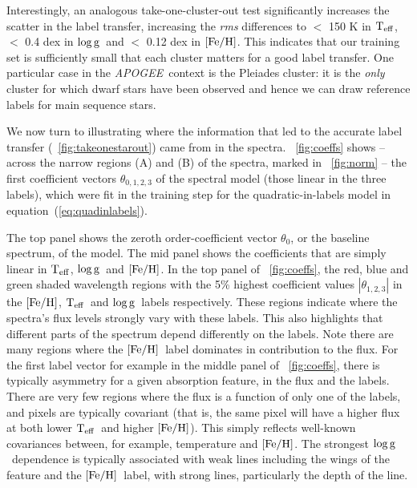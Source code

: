 \documentclass[12pt, preprint]{aastex}
\newcommand{\apogee}{\textsl{APOGEE}}
\newcommand{\teff}{\mbox{$\rm T_{eff}$}}
\newcommand{\feh}{\mbox{$\rm [Fe/H]$}}
\newcommand{\logg}{\mbox{$\rm \log g$}}
\begin{document}
Interestingly, an analogous take-one-cluster-out test significantly increases the scatter in the label transfer, 
increasing the \textit{rms} differences to $<$ 150 K in \teff, $<$ 0.4 dex in \logg\ and $<$ 0.12 dex in \feh.
This indicates that our training set is sufficiently small that each cluster matters for a good label transfer. 
One particular case in the \apogee\ context is the Pleiades cluster: it is the \textit{only} cluster for which dwarf stars have been observed and hence we can draw reference labels for main sequence stars. 
 
We now turn to illustrating where the information that led to the accurate label transfer (\figurename~\ref{fig:takeonestarout}) came from in the spectra.
\figurename~\ref{fig:coeffs} shows -- across the narrow regions (A) and (B) of the spectra, marked in \figurename~\ref{fig:norm} -- the first coefficient vectors $\theta_{0,1,2,3}$ of the spectral model (those linear in the three labels), which were fit in the training step for the quadratic-in-labels model in equation~(\ref{eq:quadinlabels}). 


The top panel shows the zeroth order-coefficient vector $\theta_0$, or the baseline spectrum, of the model. 
The mid panel shows the coefficients that are simply linear in \teff, \logg\ and \feh.
In the top panel of \figurename~\ref{fig:coeffs}, the red, blue and green shaded wavelength regions with the 5\% 
highest coefficient values $|\theta_{1,2,3}|$ in the \feh, \teff\ and \logg\ labels respectively. 
These regions indicate where the spectra's flux levels strongly vary with these labels.
This also highlights that different parts of the spectrum depend differently on the labels. Note there are many regions where the \feh\ label dominates in contribution to the flux.
For the first label vector for example in the middle panel of \figurename~\ref{fig:coeffs}, 
there is typically asymmetry for a given absorption feature, in the flux and the labels. 
There are very few regions where the flux is a function of only one of the labels, and pixels are typically covariant 
(that is, the same pixel will have a higher flux at both lower \teff\ and higher \feh). 
This simply reflects well-known covariances between, for example, temperature and \feh .
The strongest \logg\ dependence is typically associated with weak lines including the wings of the 
feature and the \feh\ label, with strong lines, particularly the depth of the line. 
\end{document}
